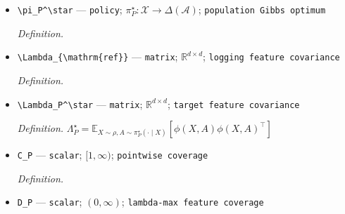 \documentclass{article}
\begin{document}
\begin{itemize}
\[\]
If \(\rho(x)>0\) and \(\pi(a\mid x)>0=\pi_{\mathrm{ref}}(a\mid x)\) for some action, then \(J_{\eta,P}(\pi)=-\infty\). On policies satisfying \(\operatorname{supp}\pi(\cdot\mid x)\subseteq\operatorname{supp}\pi_{\mathrm{ref}}(\cdot\mid x)\) for every context, this functional is finite and its restriction is real valued.
  \item \texttt{\textbackslash{}\allowbreak{}pi\_\allowbreak{}P\textasciicircum{}\textbackslash{}\allowbreak{}star} --- \texttt{policy}; \(\pi_P^\star:\mathcal X\to\Delta(\mathcal A)\); \texttt{population Gibbs optimum}
  \par\smallskip\noindent\emph{Definition.} \par\noindent {}\par\noindent
  \item \texttt{\textbackslash{}\allowbreak{}Lambda\_\allowbreak{}\{\textbackslash{}\allowbreak{}mathrm\{ref\}\allowbreak{}\}\allowbreak{}} --- \texttt{matrix}; \(\mathbb R^{d\times d}\); \texttt{logging feature covariance}
  \par\smallskip\noindent\emph{Definition.} \par\noindent {}\par\noindent
  \item \texttt{\textbackslash{}\allowbreak{}Lambda\_\allowbreak{}P\textasciicircum{}\textbackslash{}\allowbreak{}star} --- \texttt{matrix}; \(\mathbb R^{d\times d}\); \texttt{target feature covariance}
  \par\smallskip\noindent\emph{Definition.} \(\Lambda_P^\star=\mathbb E_{X\sim\rho,A\sim\pi_P^\star(\cdot\mid X)}[\phi(X,A)\phi(X,A)^\top]\)
  \item \texttt{C\_\allowbreak{}P} --- \texttt{scalar}; \([1,\infty)\); \texttt{pointwise coverage}
  \par\smallskip\noindent\emph{Definition.} \par\noindent {}\par\noindent
  \item \texttt{D\_\allowbreak{}P} --- \texttt{scalar}; \((0,\infty)\); \texttt{lambda-\allowbreak{}max feature coverage}

\end{itemize}
\end{document}
